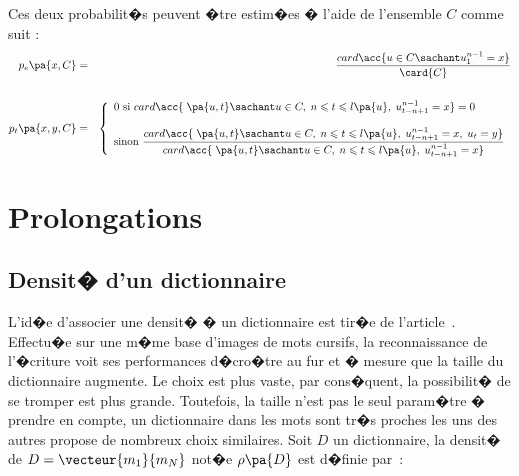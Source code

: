 Ces deux probabilit�s peuvent �tre estim�es � l'aide de l'ensemble $C$ comme suit :
    \begin{eqnarray*}
    p_e\pa{x,C}     &=&     \dfrac  {  card \acc {u \in C \sachant u_1^{n-1} = x }}   { \card{C}} \\ \\
    p_t\pa{x,y,C}   &=&     \left\{\begin{array}{l}
                            0 \text{ si } card \acc { \; \pa{u,t} \sachant u \in C, \; 
                                            n \leqslant t \leqslant l\pa{u}, \; u_{t-n+1}^{n-1} = x} = 0 \\ \\
                            \text{sinon }
                            \dfrac  {  card \acc { \; \pa{u,t} \sachant u \in C, \; 
                                            n \leqslant t \leqslant l\pa{u}, \; u_{t-n+1}^{n-1} = x, \; u_t = y}}
                                    {  card \acc { \; \pa{u,t} \sachant u \in C, \; n \leqslant t \leqslant 
                                            l\pa{u}, \; u_{t-n+1}^{n-1} = x}}
                            \end{array}
                            \right.
    \end{eqnarray*}















\section{Prolongations}





\subsection{Densit� d'un dictionnaire}


L'id�e d'associer une densit� � un dictionnaire est tir�e de l'article~. Effectu�e sur une m�me base d'images de mots cursifs, la reconnaissance de l'�criture voit ses performances d�cro�tre au fur et � mesure que la taille du dictionnaire augmente. Le choix est plus vaste, par cons�quent, la possibilit� de se tromper est plus grande. Toutefois, la taille n'est pas le seul param�tre � prendre en compte, un dictionnaire dans les mots sont tr�s proches les uns des autres propose de nombreux choix similaires. Soit $D$ un dictionnaire, la densit� de $D=\vecteur{m_1}{m_N}$ not�e $\rho\pa{D}$ est d�finie par~:

